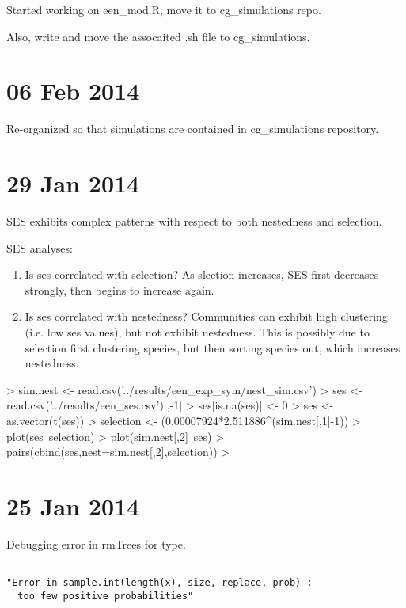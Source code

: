 \documentclass[12pt]{article}
\begin{document}
Started working on een_mod.R, move it to cg_simulations repo. 

Also, write and move the assocaited .sh file to cg_simulations.

\section{06 Feb 2014}
Re-organized so that simulations are contained in cg_simulations
repository. 

\section{29 Jan 2014}

SES exhibits complex patterns with respect to both nestedness and
selection. 

SES analyses:

\begin{enumerate}
\item Is ses correlated with selection?
  \subitem As slection increases, SES first decreases strongly, then
  begins to increase again. 
\item Is ses correlated with nestedness?
  \subitem Communities can exhibit high clustering (i.e. low ses
  values), but not exhibit nestedness. This is possibly due to
  selection first clustering species, but then sorting species out,
  which increases nestedness.
\end{enumerate}

\begin{Schunk}
\begin{Sinput}
> sim.nest <- read.csv('../results/een_exp_sym/nest_sim.csv')
> ses <- read.csv('../results/een_ses.csv')[,-1]
> ses[is.na(ses)] <- 0
> ses <- as.vector(t(ses))
> selection <- (0.00007924*2.511886^(sim.nest[,1]-1))
> plot(ses~selection)
> plot(sim.nest[,2]~ses)
> pairs(cbind(ses,nest=sim.nest[,2],selection))
> 
\end{Sinput}
\end{Schunk}


\section{25 Jan 2014}

Debugging error in rmTrees for type.

\begin{verbatim}

"Error in sample.int(length(x), size, replace, prob) :
  too few positive probabilities"

\end{verbatim}
\end{document}
